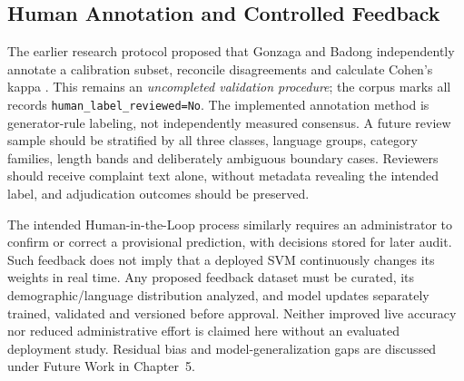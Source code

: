 \subsection{Human Annotation and Controlled Feedback}
The earlier research protocol proposed that Gonzaga and Badong independently annotate a calibration subset, reconcile disagreements and calculate Cohen's kappa \cite{artstein}. This remains an \emph{uncompleted validation procedure}; the corpus marks all records \texttt{human\_label\_reviewed=No}. The implemented annotation method is generator-rule labeling, not independently measured consensus. A future review sample should be stratified by all three classes, language groups, category families, length bands and deliberately ambiguous boundary cases. Reviewers should receive complaint text alone, without metadata revealing the intended label, and adjudication outcomes should be preserved.

The intended Human-in-the-Loop process similarly requires an administrator to confirm or correct a provisional prediction, with decisions stored for later audit. Such feedback does not imply that a deployed SVM continuously changes its weights in real time. Any proposed feedback dataset must be curated, its demographic/language distribution analyzed, and model updates separately trained, validated and versioned before approval. Neither improved live accuracy nor reduced administrative effort is claimed here without an evaluated deployment study. Residual bias and model-generalization gaps are discussed under Future Work in Chapter~5.
